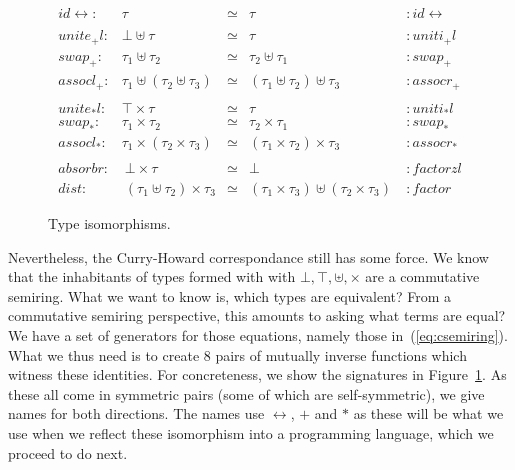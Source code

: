 \documentclass{article}
\newcommand{\identlp}{\mathit{unite}_+\mathit{l}}
\newcommand{\identrp}{\mathit{uniti}_+\mathit{l}}
\newcommand{\swapp}{\mathit{swap}_+}
\newcommand{\assoclp}{\mathit{assocl}_+}
\newcommand{\assocrp}{\mathit{assocr}_+}
\newcommand{\identlt}{\mathit{unite}_*\mathit{l}}
\newcommand{\identrt}{\mathit{uniti}_*\mathit{l}}
\newcommand{\swapt}{\mathit{swap}_*}
\newcommand{\assoclt}{\mathit{assocl}_*}
\newcommand{\assocrt}{\mathit{assocr}_*}
\newcommand{\factorzl}{\mathit{factorzl}}
\newcommand{\dist}{\mathit{dist}}
\newcommand{\factor}{\mathit{factor}}
\newcommand{\distz}{\mathit{absorbr}}
\newcommand{\iso}{\leftrightarrow}
\newcommand{\idc}{\mathit{id}\!\!\leftrightarrow}
\begin{document}
\begin{figure}[t]
\[
\begin{array}{rrcll}
\idc :& \tau & \simeq & \tau &: \idc \\
\\
\identlp :&  \bot \uplus \tau & \simeq & \tau &: \identrp \\
\swapp :&  \tau_1 \uplus \tau_2 & \simeq & \tau_2 \uplus \tau_1 &: \swapp \\
\assoclp :&  \tau_1 \uplus (\tau_2 \uplus \tau_3) & \simeq & (\tau_1 \uplus \tau_2) \uplus \tau_3 &: \assocrp \\
\\
\identlt :&  \top \times \tau & \simeq & \tau &: \identrt \\
\swapt :&  \tau_1 \times \tau_2 & \simeq & \tau_2 \times \tau_1 &: \swapt \\
\assoclt :&  \tau_1 \times (\tau_2 \times \tau_3) & \simeq & (\tau_1 \times \tau_2) \times \tau_3 &: \assocrt \\
\\
\distz :&~ \bot \times \tau & \simeq & \bot ~ &: \factorzl \\
\dist :&~ (\tau_1 \uplus \tau_2) \times \tau_3 & \simeq & (\tau_1 \times \tau_3) \uplus (\tau_2 \times \tau_3)~ &: \factor
\end{array}
\]
\caption{Type isomorphisms.}
\label{type-isos}
\end{figure}

Nevertheless, the Curry-Howard correspondance still has some
force. We know that the inhabitants of types formed with
with $\bot, \top, \uplus, \times$ are a commutative semiring. What we
want to know is, which types are equivalent? From a commutative semiring
perspective, this amounts to asking what terms are equal?
We have a set of generators for those equations, namely those
in~(\ref{eq:csemiring}). What we thus need is to create $8$ pairs
of mutually inverse functions which witness these identities.
For concreteness, we show the signatures in Figure~\ref{type-isos}.
As these all come in symmetric pairs (some of which are self-symmetric),
we give names for both directions. The names use $\iso$, $+$ and $*$
as these will be what we use when we reflect these isomorphism into
a programming language, which we proceed to do next.
\end{document}
